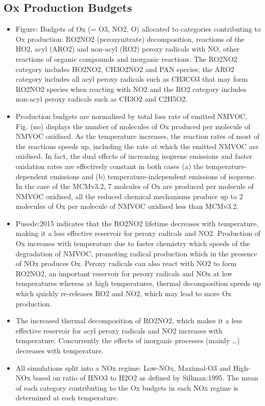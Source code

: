 \documentclass[11pt,a4paper]{article}
\begin{document}
\subsection{Ox Production Budgets}
\begin{itemize}
    \item Figure: Budgets of Ox (= O3, NO2, O) allocated to categories contributing to Ox production: RO2NO2 (peroxynitrate) decomposition, reactions of the HO2, acyl (ARO2) and non-acyl (RO2) peroxy radicals with NO, other reactions of organic compounds and inorganic reactions. The RO2NO2 category includes HO2NO2, CH3O2NO2 and PAN species; the ARO2 category includes all acyl peroxy radicals such as CH3CO3 that may form RO2NO2 species when reacting with NO2 and the RO2 category includes non-acyl peroxy radicals such as CH3O2 and C2H5O2.
    \item Production budgets are normalised by total loss rate of emitted NMVOC, Fig. (no) displays the number of molecules of Ox produced per molecule of NMVOC oxidised. As the temperature increases, the reaction rates of most of the reactions speeds up, including the rate at which the emitted NMVOC are oxidised. In fact, the dual effects of increasing isoprene emissions and faster oxidation rates are effectively constant in both cases (a) the temperature-dependent emissions and (b) temperature-independent emissions of isoprene. In the case of the MCMv3.2, 7 molcules of Ox are produced per molecule of NMVOC oxidised, all the reduced chemical mechanisms produce up to 2 molecules of Ox per molecule of NMVOC oxidised less than MCMv3.2.
    \item Pusede:2015 indicates that the RO2NO2 lifetime decreases with temperature, making it a less effective reservoir for peroxy radicals and NO2. Production of Ox increases with temperature due to faster chemistry which speeds of the degradation of NMVOC, promoting radical production which in the presence of NOx produces Ox. Peroxy radicals can also react with NO2 to form RO2NO2, an important reservoir for peroxy radicals and NOx at low temperatures whereas at high temperatures, thermal decomposition speeds up which quickly re-releases RO2 and NO2, which may lead to more Ox production.
    \item The increased thermal decomposition of RO2NO2, which makes it a less effective reservoir for acyl peroxy radicals and NO2 increases with temperature. Concurrently the effects of inorganic processes (mainly \dots) decreases with temperature.
    \item All simulations split into a NOx regime: Low-NOx, Maximal-O3 and High-NOx based on ratio of HNO3 to H2O2 as defined by Sillman:1995. The mean of each category contributing to the Ox budgets in each NOx regime is determined at each temperature.

\end{itemize}
\end{document}
